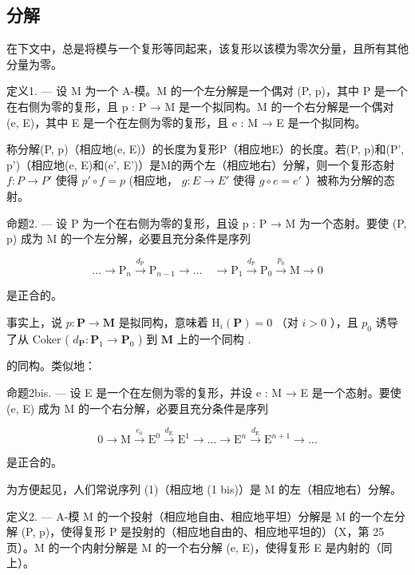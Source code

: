 \subsection{分解}

在下文中，总是将模与一个复形等同起来，该复形以该模为零次分量，且所有其他分量为零。

定义1. --- 设 M 为一个 A-模。M 的一个左分解是一个偶对 (P, p)，其中 P 是一个在右侧为零的复形，且 p : P → M 是一个拟同构。M 的一个右分解是一个偶对 (e, E)，其中 E 是一个在左侧为零的复形，且 e : M → E 是一个拟同构。

称分解(P, p)（相应地(e, E)）的长度为复形P（相应地E）的长度。若(P, p)和(P', p')（相应地(e, E)和(e', E')）是M的两个左（相应地右）分解，则一个复形态射 \(f: P \to P'\) 使得 \(p' \circ f = p\) (相应地， \(g: E \to E'\) 使得 \(g \circ e = e'\) ）被称为分解的态射。

命题2. --- 设 P 为一个在右侧为零的复形，且设 p : P → M 为一个态射。要使 (P, p) 成为 M 的一个左分解，必要且充分条件是序列

\[
\dots \longrightarrow \mathrm{P} _ {n} \xrightarrow {d _ {\mathrm{P}}} \mathrm{P} _ {n - 1} \longrightarrow \dots \quad \longrightarrow \mathrm{P} _ {1} \xrightarrow {d _ {\mathrm{P}}} \mathrm{P} _ {0} \xrightarrow {p _ {0}} \mathrm{M} \longrightarrow 0\tag{1}
\]

是正合的。

事实上，说 \(p: \mathbf{P} \to \mathbf{M}\) 是拟同构，意味着 \(\mathrm{H}_{i}(\mathbf{P}) = 0\) （对 \(i > 0\) ），且 \(p_{0}\) 诱导了从 Coker ( \(d_{\mathbf{P}}: \mathbf{P}_{1} \to \mathbf{P}_{0}\) ) 到 \(\mathbf{M}\) 上的一个同构 .

的同构。类似地：

命题2bis. --- 设 E 是一个在左侧为零的复形，并设 e : M → E 是一个态射。要使 (e, E) 成为 M 的一个右分解，必要且充分条件是序列

\[
0 \longrightarrow \mathrm{M} \stackrel {e _ {0}} {\longrightarrow} \mathrm{E} ^ {0} \stackrel {d _ {\mathrm{E}}} {\longrightarrow} \mathrm{E} ^ {1} \longrightarrow \dots \longrightarrow \mathrm{E} ^ {n} \stackrel {d _ {\mathrm{E}}} {\longrightarrow} \mathrm{E} ^ {n + 1} \longrightarrow \dots\tag{1 bis}
\]

是正合的。

为方便起见，人们常说序列 (1)（相应地 (1 bis)）是 M 的左（相应地右）分解。

定义2. --- A-模 M 的一个投射（相应地自由、相应地平坦）分解是 M 的一个左分解 (P, p)，使得复形 P 是投射的（相应地自由的、相应地平坦的）（X，第 25 页）。M 的一个内射分解是 M 的一个右分解 (e, E)，使得复形 E 是内射的（同上）。


